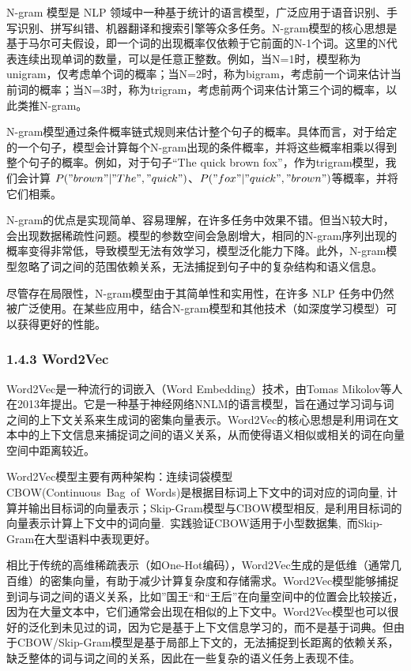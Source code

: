 \documentclass[
]{article}
\begin{document}
N-gram 模型是 NLP
领域中一种基于统计的语言模型，广泛应用于语音识别、手写识别、拼写纠错、机器翻译和搜索引擎等众多任务。N-gram模型的核心思想是基于马尔可夫假设，即一个词的出现概率仅依赖于它前面的N-1个词。这里的N代表连续出现单词的数量，可以是任意正整数。例如，当N=1时，模型称为unigram，仅考虑单个词的概率；当N=2时，称为bigram，考虑前一个词来估计当前词的概率；当N=3时，称为trigram，考虑前两个词来估计第三个词的概率，以此类推N-gram。

N-gram模型通过条件概率链式规则来估计整个句子的概率。具体而言，对于给定的一个句子，模型会计算每个N-gram出现的条件概率，并将这些概率相乘以得到整个句子的概率。例如，对于句子``The
quick brown fox''，作为trigram模型，我们会计算
\(P("brown" | "The", "quick")\)、\(P("fox" | "quick", "brown")\)等概率，并将它们相乘。

N-gram的优点是实现简单、容易理解，在许多任务中效果不错。但当N较大时，会出现数据稀疏性问题。模型的参数空间会急剧增大，相同的N-gram序列出现的概率变得非常低，导致模型无法有效学习，模型泛化能力下降。此外，N-gram模型忽略了词之间的范围依赖关系，无法捕捉到句子中的复杂结构和语义信息。

尽管存在局限性，N-gram模型由于其简单性和实用性，在许多 NLP
任务中仍然被广泛使用。在某些应用中，结合N-gram模型和其他技术（如深度学习模型）可以获得更好的性能。

\subsubsection{1.4.3 Word2Vec}\label{word2vec}

Word2Vec是一种流行的词嵌入（Word Embedding）技术，由Tomas
Mikolov等人在2013年提出。它是一种基于神经网络NNLM的语言模型，旨在通过学习词与词之间的上下文关系来生成词的密集向量表示。Word2Vec的核心思想是利用词在文本中的上下文信息来捕捉词之间的语义关系，从而使得语义相似或相关的词在向量空间中距离较近。

Word2Vec模型主要有两种架构：连续词袋模型CBOW(Continuous~Bag~of~Words)是根据目标词上下文中的词对应的词向量,
计算并输出目标词的向量表示；Skip-Gram模型与CBOW模型相反,~是利用目标词的向量表示计算上下文中的词向量.~实践验证CBOW适用于小型数据集,~而Skip-Gram在大型语料中表现更好。

相比于传统的高维稀疏表示（如One-Hot编码），Word2Vec生成的是低维（通常几百维）的密集向量，有助于减少计算复杂度和存储需求。Word2Vec模型能够捕捉到词与词之间的语义关系，比如''国王``和``王后''在向量空间中的位置会比较接近，因为在大量文本中，它们通常会出现在相似的上下文中。Word2Vec模型也可以很好的泛化到未见过的词，因为它是基于上下文信息学习的，而不是基于词典。但由于CBOW/Skip-Gram模型是基于局部上下文的，无法捕捉到长距离的依赖关系，缺乏整体的词与词之间的关系，因此在一些复杂的语义任务上表现不佳。
\end{document}
